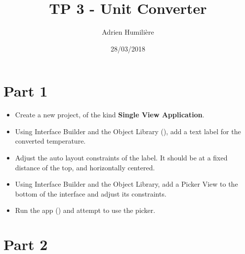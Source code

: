 \documentclass[a4paper,11pt]{scrartcl}
\begin{document}
\newcommand{\mytitle}{TP 3 - Unit Converter}
\title{\mytitle}
\author{Adrien Humilière}
\date{28/03/2018}

\maketitle

\section*{Part 1}

\begin{itemize}
\item Create a new project, of the kind \textbf{Single View Application}.
\item Using Interface Builder and the Object Library (), add a text label for the converted temperature.
\item Adjust the auto layout constraints of the label. It should be at a fixed distance of the top, and horizontally centered.
\item Using Interface Builder and the Object Library, add a Picker View to the bottom of the interface and adjust its constraints.
\item Run the app () and attempt to use the picker.
\end{itemize}

\section*{Part 2}
\end{document}
